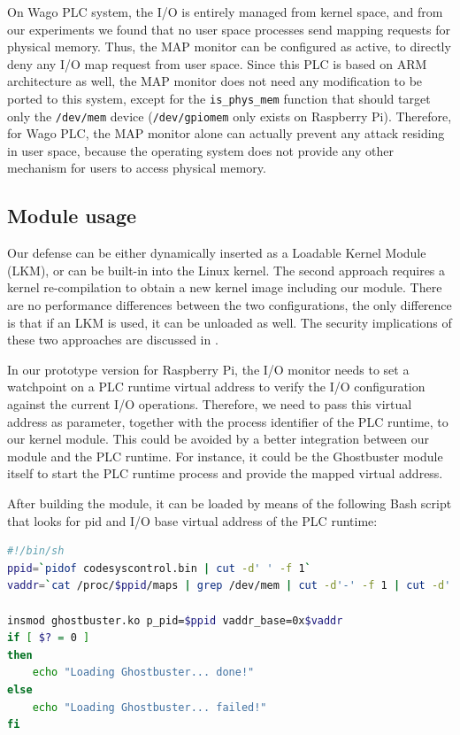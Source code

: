 On Wago PLC system, the I/O is entirely managed from kernel space, and from our experiments we found that no user space processes send mapping requests for physical memory.
Thus, the MAP monitor can be configured as active, to directly deny any I/O map request from user space.
Since this PLC is based on ARM architecture as well, the MAP monitor does not need any modification to be ported to this system,
except for the \verb|is_phys_mem| function that should target only the \verb|/dev/mem| device (\verb|/dev/gpiomem| only exists on Raspberry Pi).
Therefore, for Wago PLC, the MAP monitor alone can actually prevent any attack residing in user space, because the operating system does not provide
any other mechanism for users to access physical memory.


\subsection{Module usage}
\label{sec:def_usage}

Our defense can be either dynamically inserted as a Loadable Kernel Module (LKM), or can be built-in into the Linux kernel.
The second approach requires a kernel re-compilation to obtain a new kernel image including our module.
There are no performance differences between the two configurations, the only difference is that if an LKM is used, it can be unloaded as well.
The security implications of these two approaches are discussed in .

In our prototype version for Raspberry Pi, the I/O monitor needs to set a watchpoint on a PLC runtime virtual address to verify the I/O configuration
against the current I/O operations. Therefore, we need to pass this virtual address as parameter, together with the process identifier of the PLC runtime, to our kernel module.
This could be avoided by a better integration between our module and the PLC runtime.
For instance, it could be the Ghostbuster module itself to start the PLC runtime process and provide the mapped virtual address.

After building the module, it can be loaded by means of the following Bash script that looks for pid and I/O base virtual address of the PLC runtime:
\begin{lstlisting}[language=bash]
#!/bin/sh
ppid=`pidof codesyscontrol.bin | cut -d' ' -f 1`
vaddr=`cat /proc/$ppid/maps | grep /dev/mem | cut -d'-' -f 1 | cut -d' ' -f 1`

insmod ghostbuster.ko p_pid=$ppid vaddr_base=0x$vaddr
if [ $? = 0 ]
then
	echo "Loading Ghostbuster... done!"
else
	echo "Loading Ghostbuster... failed!"
fi
\end{lstlisting}

